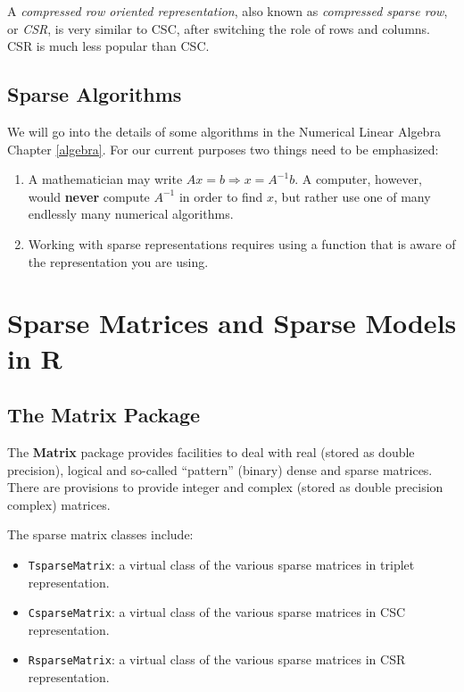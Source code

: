 \documentclass[]{book}
\providecommand{\tightlist}{%
  \setlength{\itemsep}{0pt}\setlength{\parskip}{0pt}}
\theoremstyle{definition}
\theoremstyle{definition}
\theoremstyle{definition}
\theoremstyle{remark}
\begin{document}
A \emph{compressed row oriented representation}, also known as
\emph{compressed sparse row}, or \emph{CSR}, is very similar to CSC,
after switching the role of rows and columns. CSR is much less popular
than CSC.

\subsection{Sparse Algorithms}\label{sparse-algorithms}

We will go into the details of some algorithms in the Numerical Linear
Algebra Chapter \ref{algebra}. For our current purposes two things need
to be emphasized:

\begin{enumerate}
\def\labelenumi{\arabic{enumi}.}
\item
  A mathematician may write \(Ax=b \Rightarrow x=A^{-1}b\). A computer,
  however, would \textbf{never} compute \(A^{-1}\) in order to find
  \(x\), but rather use one of many endlessly many numerical algorithms.
\item
  Working with sparse representations requires using a function that is
  aware of the representation you are using.
\end{enumerate}

\section{Sparse Matrices and Sparse Models in
R}\label{sparse-matrices-and-sparse-models-in-r}

\subsection{The Matrix Package}\label{the-matrix-package}

The \textbf{Matrix} package provides facilities to deal with real
(stored as double precision), logical and so-called ``pattern'' (binary)
dense and sparse matrices. There are provisions to provide integer and
complex (stored as double precision complex) matrices.

The sparse matrix classes include:

\begin{itemize}
\tightlist
\item
  \texttt{TsparseMatrix}: a virtual class of the various sparse matrices
  in triplet representation.
\item
  \texttt{CsparseMatrix}: a virtual class of the various sparse matrices
  in CSC representation.
\item
  \texttt{RsparseMatrix}: a virtual class of the various sparse matrices
  in CSR representation.
\end{itemize}
\end{document}
